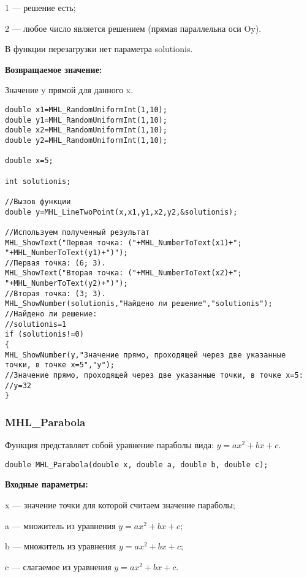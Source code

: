 \documentclass[a4paper,12pt]{article}
\begin{document}
 1 --- решение есть;
 
 2 --- любое число является решением (прямая параллельна оси Oy).
 
В функции перезагрузки нет параметра solutionis.

\textbf{Возвращаемое значение:}

Значение y прямой для данного x.


\begin{lstlisting}[label=code_use_MHL_LineTwoPoint,caption=Пример использования]
double x1=MHL_RandomUniformInt(1,10);
double y1=MHL_RandomUniformInt(1,10);
double x2=MHL_RandomUniformInt(1,10);
double y2=MHL_RandomUniformInt(1,10);

double x=5;

int solutionis;

//Вызов функции
double y=MHL_LineTwoPoint(x,x1,y1,x2,y2,&solutionis);

//Используем полученный результат
MHL_ShowText("Первая точка: ("+MHL_NumberToText(x1)+"; "+MHL_NumberToText(y1)+")");
//Первая точка: (6; 3).
MHL_ShowText("Вторая точка: ("+MHL_NumberToText(x2)+"; "+MHL_NumberToText(y2)+")");
//Вторая точка: (3; 3).
MHL_ShowNumber(solutionis,"Найдено ли решение","solutionis");
//Найдено ли решение:
//solutionis=1
if (solutionis!=0)
{
MHL_ShowNumber(y,"Значение прямо, проходящей через две указанные точки, в точке x=5","y");
//Значение прямо, проходящей через две указанные точки, в точке x=5:
//y=32
}
\end{lstlisting}

\subsubsection{MHL\_Parabola}\label{MHL_Parabola}

Функция представляет собой уравнение параболы вида: $y=ax^2+bx+c$.


\begin{lstlisting}[label=code_syntax_MHL_Parabola,caption=Синтаксис]
double MHL_Parabola(double x, double a, double b, double c);
\end{lstlisting}

\textbf{Входные параметры:}  
 
x --- значение точки для которой считаем значение параболы;
 
a --- множитель из уравнения $y=ax^2+bx+c$;
 
b --- множитель из уравнения $y=ax^2+bx+c$;
 
c --- слагаемое из уравнения $y=ax^2+bx+c$.
\end{document}

